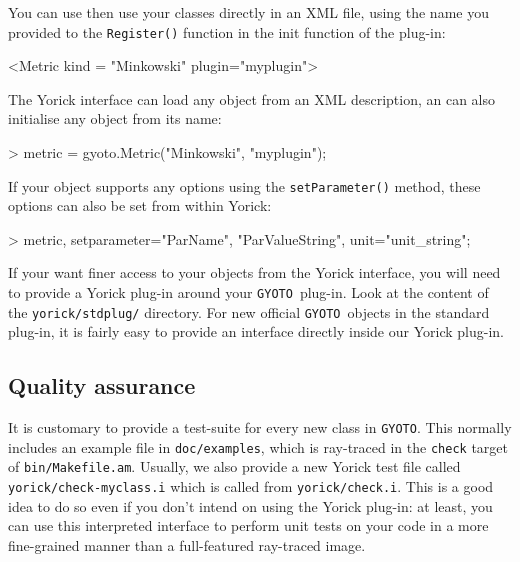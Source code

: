 \documentclass[a4paper,12pt]{article}
\providecommand{\GyotoSrcDir}{../..}
\newcommand{\GYOTO}{\texttt{GYOTO}}
\begin{document}
You can use then use your classes directly in an XML file, using the
name you provided to the \texttt{Register()} function in the init
function of the plug-in:
\begin{code}
   <Metric kind = "Minkowski" plugin="myplugin">
\end{code}
The Yorick interface can load any object from an XML description, an
can also initialise any object from its name:
\begin{code}
 > metric = gyoto.Metric("Minkowski", "myplugin");
\end{code}
If your object supports any options using the \texttt{setParameter()}
method, these options can also be set from within Yorick:
\begin{code}
 > metric, setparameter="ParName", "ParValueString", unit="unit_string";
\end{code}
If your want finer access to your objects from the Yorick interface,
you will need to provide a Yorick plug-in around your \GYOTO\
plug-in. Look at the content of the \texttt{yorick/stdplug/}
directory. For new official \GYOTO\ objects in the standard plug-in,
it is fairly easy to provide an interface directly inside our Yorick
plug-in.

\subsection{Quality assurance}

It is customary to provide a test-suite for every new class in
\GYOTO. This normally includes an example file in
\texttt{doc/examples}, which is ray-traced in the \texttt{check}
target of \texttt{bin/Makefile.am}. Usually, we also provide a new
Yorick test file called\\
\texttt{yorick/check-myclass.i} which is
called from \texttt{yorick/check.i}. This is a good idea to do so even
if you don't intend on using the Yorick plug-in: at least, you can use
this interpreted interface to perform unit tests on your code in a
more fine-grained manner than a full-featured ray-traced image.



\end{document}
